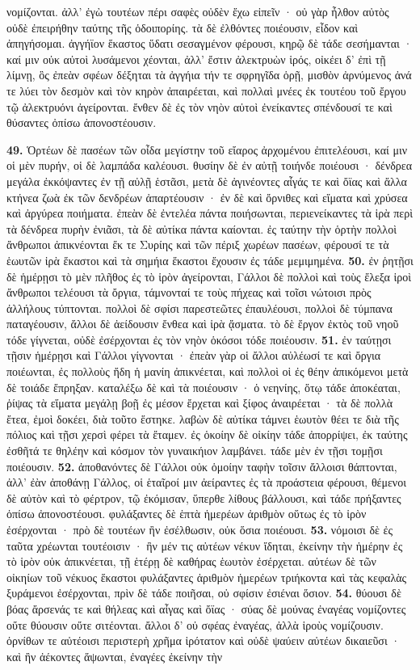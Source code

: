 \documentclass[a4paper, 11pt, oneside, polutonikogreek, german]{article}
\begin{document}
νομίζονται. ἀλλ' ἐγὼ τουτέων πέρι σαφὲς οὐδὲν ἔχω εἰπεῖν · οὐ γὰρ ἦλθον αὐτὸς οὐδὲ ἐπειρήθην ταύτης τῆς ὁδοιπορίης. τὰ δὲ ἐλθόντες ποιέουσιν, εἶδον καὶ ἀπηγήσομαι. ἀγγήϊον ἕκαστος ὕδατι σεσαγμένον φέρουσι, κηρῷ δὲ τάδε σεσήμανται · καί μιν οὐκ αὐτοὶ λυσάμενοι χέονται, ἀλλ' ἔστιν ἀλεκτρυὼν ἱρός, οἰκέει δ' ἐπὶ τῇ λίμνῃ, ὃς ἐπεὰν σφέων δέξηται τὰ ἀγγήια τήν τε σφρηγῖδα ὁρῇ, μισθὸν ἀρνύμενος ἀνά τε λύει τὸν δεσμὸν καὶ τὸν κηρὸν ἀπαιρέεται, καὶ πολλαὶ μνέες ἐκ τουτέου τοῦ ἔργου τῷ ἀλεκτρυόνι ἀγείρονται. ἔνθεν δὲ ἐς τὸν νηὸν αὐτοὶ ἐνείκαντες σπένδουσί τε καὶ θύσαντες ὀπίσω ἀπονοστέουσιν.

\textbf{49.} Ὁρτέων δὲ πασέων τῶν οἶδα μεγίστην τοῦ εἴαρος ἀρχομένου ἐπιτελέουσι, καί μιν οἱ μὲν πυρήν, οἱ δὲ λαμπάδα καλέουσι. θυσίην δὲ ἐν αὐτῇ τοιήνδε ποιέουσι · δένδρεα μεγάλα ἐκκόψαντες ἐν τῇ αὐλῇ ἑστᾶσι, μετὰ δὲ ἀγινέοντες αἶγάς τε καὶ ὄϊας καὶ ἄλλα κτήνεα ζωὰ ἐκ τῶν δενδρέων ἀπαρτέουσιν · ἐν δὲ καὶ ὄρνιθες καὶ εἵματα καὶ χρύσεα καὶ ἀργύρεα ποιήματα. ἐπεὰν δὲ ἐντελέα πάντα ποιήσωνται, περιενείκαντες τὰ ἱρὰ περὶ τὰ δένδρεα πυρὴν ἐνιᾶσι, τὰ δὲ αὐτίκα πάντα καίονται. ἐς ταύτην τὴν ὁρτὴν πολλοὶ ἄνθρωποι ἀπικνέονται ἔκ τε Συρίης καὶ τῶν πέριξ χωρέων πασέων, φέρουσί τε τὰ ἑωυτῶν ἱρὰ ἕκαστοι καὶ τὰ σημήια ἕκαστοι ἔχουσιν ἐς τάδε μεμιμημένα. \textbf{50.} ἐν ῥητῇσι δὲ ἡμέρῃσι τὸ μὲν πλῆθος ἐς τὸ ἱρὸν ἀγείρονται, Γάλλοι δὲ πολλοὶ καὶ τοὺς ἔλεξα ἱροὶ ἄνθρωποι τελέουσι τὰ ὄργια, τάμνονταί τε τοὺς πήχεας καὶ τοῖσι νώτοισι πρὸς ἀλλήλους τύπτονται. πολλοὶ δὲ σφίσι παρεστεῶτες ἐπαυλέουσι, πολλοὶ δὲ τύμπανα παταγέουσιν, ἄλλοι δὲ ἀείδουσιν ἔνθεα καὶ ἱρὰ ᾄσματα. τὸ δὲ ἔργον ἐκτὸς τοῦ νηοῦ τόδε γίγνεται, οὐδὲ ἐσέρχονται ἐς τὸν νηὸν ὁκόσοι τόδε ποιέουσιν. \textbf{51.} ἐν ταύτῃσι τῇσιν ἡμέρῃσι καὶ Γάλλοι γίγνονται · ἐπεὰν γὰρ οἱ ἄλλοι αὐλέωσί τε καὶ ὄργια ποιέωνται, ἐς πολλοὺς ἤδη ἡ μανίη ἀπικνέεται, καὶ πολλοὶ οἱ ἐς θέην ἀπικόμενοι μετὰ δὲ τοιάδε ἔπρηξαν. καταλέξω δὲ καὶ τὰ ποιέουσιν · ὁ νεηνίης, ὅτῳ τάδε ἀποκέαται, ῥίψας τὰ εἵματα μεγάλῃ βοῇ ἐς μέσον ἔρχεται καὶ ξίφος ἀναιρέεται · τὰ δὲ πολλὰ ἔτεα, ἐμοὶ δοκέει, διὰ τοῦτο ἕστηκε. λαβὼν δὲ αὐτίκα τάμνει ἑωυτὸν θέει τε διὰ τῆς πόλιος καὶ τῇσι χερσὶ φέρει τὰ ἔταμεν. ἐς ὁκοίην δὲ οἰκίην τάδε ἀπορρίψει, ἐκ ταύτης ἐσθῆτά τε θηλέην καὶ κόσμον τὸν γυναικήιον λαμβάνει. τάδε μὲν ἐν τῇσι τομῇσι ποιέουσιν. \textbf{52.} ἀποθανόντες δὲ Γάλλοι οὐκ ὁμοίην ταφὴν τοῖσιν ἄλλοισι θάπτονται, ἀλλ' ἐὰν ἀποθάνῃ Γάλλος, οἱ ἑταῖροί μιν ἀείραντες ἐς τὰ προάστεια φέρουσι, θέμενοι δὲ αὐτὸν καὶ τὸ φέρτρον, τῷ ἐκόμισαν, ὕπερθε λίθους βάλλουσι, καὶ τάδε πρήξαντες ὀπίσω ἀπονοστέουσι. φυλάξαντες δὲ ἑπτὰ ἡμερέων ἀριθμὸν οὕτως ἐς τὸ ἱρὸν ἐσέρχονται · πρὸ δὲ τουτέων ἢν ἐσέλθωσιν, οὐκ ὅσια ποιέουσι. \textbf{53.} νόμοισι δὲ ἐς ταῦτα χρέωνται τουτέοισιν · ἢν μέν τις αὐτέων νέκυν ἴδηται, ἐκείνην τὴν ἡμέρην ἐς τὸ ἱρὸν οὐκ ἀπικνέεται, τῇ ἑτέρῃ δὲ καθήρας ἑωυτὸν ἐσέρχεται. αὐτέων δὲ τῶν οἰκηίων τοῦ νέκυος ἕκαστοι φυλάξαντες ἀριθμὸν ἡμερέων τριήκοντα καὶ τὰς κεφαλὰς ξυράμενοι ἐσέρχονται, πρὶν δὲ τάδε ποιῆσαι, οὐ σφίσιν ἐσιέναι ὅσιον. \textbf{54.} θύουσι δὲ βόας ἄρσενάς τε καὶ θήλεας καὶ αἶγας καὶ ὄϊας · σύας δὲ μούνας ἐναγέας νομίζοντες οὔτε θύουσιν οὔτε σιτέονται. ἄλλοι δ' οὐ σφέας ἐναγέας, ἀλλὰ ἱροὺς νομίζουσιν. ὀρνίθων τε αὐτέοισι περιστερὴ χρῆμα ἱρότατον καὶ οὐδὲ ψαύειν αὐτέων δικαιεῦσι · καὶ ἢν ἀέκοντες ἅψωνται, ἐναγέες ἐκείνην τὴν 
\end{document}
